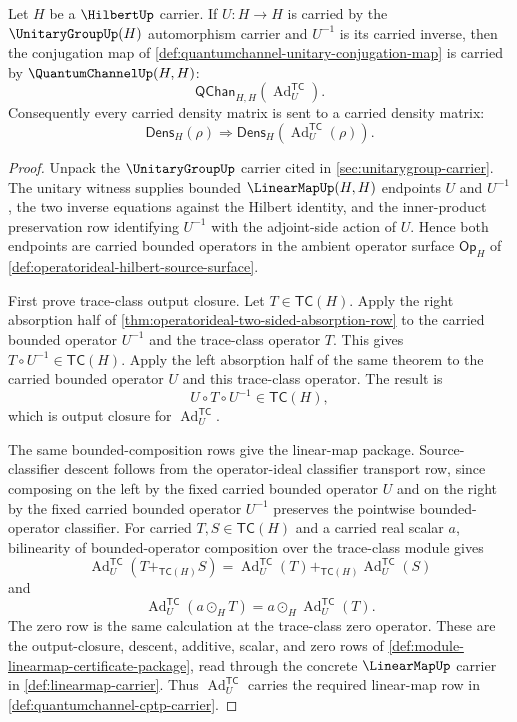 \begin{theorem}
\label{thm:unitary-conjugation-quantumchannel}
Let $H$ be a $\HilbertUp$ carrier. If $U:H\to H$ is carried by the $\UnitaryGroupUp(H)$ automorphism carrier and $U^{-1}$ is its carried inverse, then the conjugation map of \autoref{def:quantumchannel-unitary-conjugation-map} is carried by $\QuantumChannelUp(H,H)$:
$$
\mathsf{QChan}_{H,H}(\operatorname{Ad}^{\mathsf{TC}}_U).
$$
Consequently every carried density matrix is sent to a carried density matrix:
$$
\mathsf{Dens}_H(\rho)\Longrightarrow \mathsf{Dens}_H(\operatorname{Ad}^{\mathsf{TC}}_U(\rho)).
$$
\end{theorem}
\begin{proof}
Unpack the $\UnitaryGroupUp$ carrier cited in \autoref{sec:unitarygroup-carrier}. The unitary witness supplies bounded $\LinearMapUp(H,H)$ endpoints $U$ and $U^{-1}$, the two inverse equations against the Hilbert identity, and the inner-product preservation row identifying $U^{-1}$ with the adjoint-side action of $U$. Hence both endpoints are carried bounded operators in the ambient operator surface $\mathsf{Op}_H$ of \autoref{def:operatorideal-hilbert-source-surface}.

First prove trace-class output closure. Let $T\in\mathsf{TC}(H)$. Apply the right absorption half of \autoref{thm:operatorideal-two-sided-absorption-row} to the carried bounded operator $U^{-1}$ and the trace-class operator $T$. This gives $T\circ U^{-1}\in\mathsf{TC}(H)$. Apply the left absorption half of the same theorem to the carried bounded operator $U$ and this trace-class operator. The result is
$$
U\circ T\circ U^{-1}\in\mathsf{TC}(H),
$$
which is output closure for $\operatorname{Ad}^{\mathsf{TC}}_U$.

The same bounded-composition rows give the linear-map package. Source-classifier descent follows from the operator-ideal classifier transport row, since composing on the left by the fixed carried bounded operator $U$ and on the right by the fixed carried bounded operator $U^{-1}$ preserves the pointwise bounded-operator classifier. For carried $T,S\in\mathsf{TC}(H)$ and a carried real scalar $a$, bilinearity of bounded-operator composition over the trace-class module gives
$$
\operatorname{Ad}^{\mathsf{TC}}_U(T+_{\mathsf{TC}(H)}S)
=
\operatorname{Ad}^{\mathsf{TC}}_U(T)+_{\mathsf{TC}(H)}\operatorname{Ad}^{\mathsf{TC}}_U(S)
$$
and
$$
\operatorname{Ad}^{\mathsf{TC}}_U(a\odot_H T)
=
a\odot_H\operatorname{Ad}^{\mathsf{TC}}_U(T).
$$
The zero row is the same calculation at the trace-class zero operator. These are the output-closure, descent, additive, scalar, and zero rows of \autoref{def:module-linearmap-certificate-package}, read through the concrete $\LinearMapUp$ carrier in \autoref{def:linearmap-carrier}. Thus $\operatorname{Ad}^{\mathsf{TC}}_U$ carries the required linear-map row in \autoref{def:quantumchannel-cptp-carrier}.


\end{proof}
